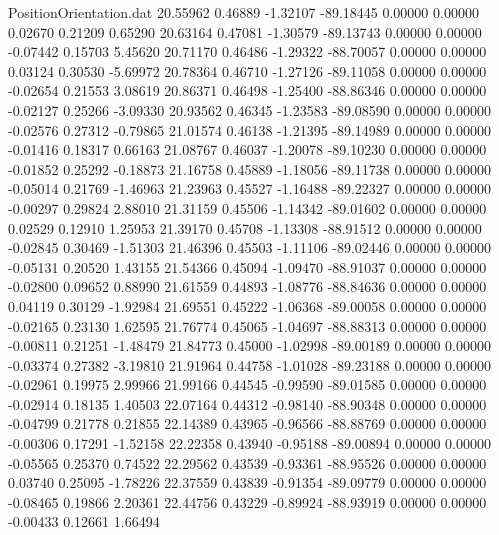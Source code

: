 \begin{filecontents}{PositionOrientation.dat}
  20.55962    0.46889   -1.32107   -89.18445    0.00000    0.00000    0.02670    0.21209    0.65290
  20.63164    0.47081   -1.30579   -89.13743    0.00000    0.00000   -0.07442    0.15703    5.45620
  20.71170    0.46486   -1.29322   -88.70057    0.00000    0.00000    0.03124    0.30530   -5.69972
  20.78364    0.46710   -1.27126   -89.11058    0.00000    0.00000   -0.02654    0.21553    3.08619
  20.86371    0.46498   -1.25400   -88.86346    0.00000    0.00000   -0.02127    0.25266   -3.09330
  20.93562    0.46345   -1.23583   -89.08590    0.00000    0.00000   -0.02576    0.27312   -0.79865
  21.01574    0.46138   -1.21395   -89.14989    0.00000    0.00000   -0.01416    0.18317    0.66163
  21.08767    0.46037   -1.20078   -89.10230    0.00000    0.00000   -0.01852    0.25292   -0.18873
  21.16758    0.45889   -1.18056   -89.11738    0.00000    0.00000   -0.05014    0.21769   -1.46963
  21.23963    0.45527   -1.16488   -89.22327    0.00000    0.00000   -0.00297    0.29824    2.88010
  21.31159    0.45506   -1.14342   -89.01602    0.00000    0.00000    0.02529    0.12910    1.25953
  21.39170    0.45708   -1.13308   -88.91512    0.00000    0.00000   -0.02845    0.30469   -1.51303
  21.46396    0.45503   -1.11106   -89.02446    0.00000    0.00000   -0.05131    0.20520    1.43155
  21.54366    0.45094   -1.09470   -88.91037    0.00000    0.00000   -0.02800    0.09652    0.88990
  21.61559    0.44893   -1.08776   -88.84636    0.00000    0.00000    0.04119    0.30129   -1.92984
  21.69551    0.45222   -1.06368   -89.00058    0.00000    0.00000   -0.02165    0.23130    1.62595
  21.76774    0.45065   -1.04697   -88.88313    0.00000    0.00000   -0.00811    0.21251   -1.48479
  21.84773    0.45000   -1.02998   -89.00189    0.00000    0.00000   -0.03374    0.27382   -3.19810
  21.91964    0.44758   -1.01028   -89.23188    0.00000    0.00000   -0.02961    0.19975    2.99966
  21.99166    0.44545   -0.99590   -89.01585    0.00000    0.00000   -0.02914    0.18135    1.40503
  22.07164    0.44312   -0.98140   -88.90348    0.00000    0.00000   -0.04799    0.21778    0.21855
  22.14389    0.43965   -0.96566   -88.88769    0.00000    0.00000   -0.00306    0.17291   -1.52158
  22.22358    0.43940   -0.95188   -89.00894    0.00000    0.00000   -0.05565    0.25370    0.74522
  22.29562    0.43539   -0.93361   -88.95526    0.00000    0.00000    0.03740    0.25095   -1.78226
  22.37559    0.43839   -0.91354   -89.09779    0.00000    0.00000   -0.08465    0.19866    2.20361
  22.44756    0.43229   -0.89924   -88.93919    0.00000    0.00000   -0.00433    0.12661    1.66494

\end{filecontents}
